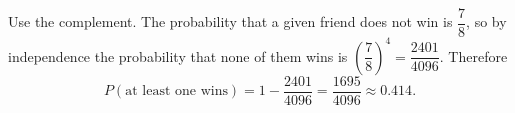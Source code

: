 Use the complement. The probability that a given friend does not win is $\dfrac{7}{8}$, so by independence the probability that none of them wins is $\left(\dfrac{7}{8}\right)^4=\dfrac{2401}{4096}$. Therefore
\[
P(\text{at least one wins})=1-\dfrac{2401}{4096}=\boxed{\dfrac{1695}{4096}}\approx0.414 .
\]
